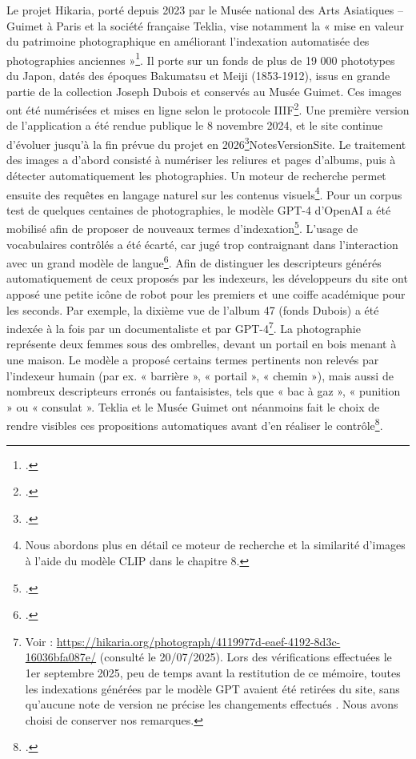 Le projet Hikaria, porté depuis 2023 par le Musée national des Arts Asiatiques – Guimet à Paris et la société française Teklia, vise notamment la « mise en valeur du patrimoine photographique en améliorant l’indexation automatisée des photographies anciennes »\footcite[p. 24]{desaint-oursProjetHikarIAEtude2024}. Il porte sur un fonds de plus de 19 000 phototypes du Japon, datés des époques Bakumatsu et Meiji (1853-1912), issus en grande partie de la collection Joseph Dubois et conservés au Musée Guimet. Ces images ont été numérisées et mises en ligne selon le protocole IIIF\footcite[p. 20]{desaint-oursProjetHikarIAEtude2024}. Une première version de l’application a été rendue publique le 8 novembre 2024, et le site continue d’évoluer jusqu’à la fin prévue du projet en 2026\footcite[p. 24]{desaint-oursProjetHikarIAEtude2024}{NotesVersionSite}. Le traitement des images a d’abord consisté à numériser les reliures et pages d’albums, puis à détecter automatiquement les photographies. Un moteur de recherche permet ensuite des requêtes en langage naturel sur les contenus visuels\footnote{Nous abordons plus en détail ce moteur de recherche et la similarité d’images à l’aide du modèle CLIP dans le chapitre 8.}. Pour un corpus test de quelques centaines de photographies, le modèle GPT-4 d’OpenAI a été mobilisé afin de proposer de nouveaux termes d’indexation\footcite{kermorvantProjetHikarIAAnalyse2025}. L’usage de vocabulaires contrôlés a été écarté, car jugé trop contraignant dans l’interaction avec un grand modèle de langue\footcite[p. 23]{desaint-oursProjetHikarIAEtude2024}. Afin de distinguer les descripteurs générés automatiquement de ceux proposés par les indexeurs, les développeurs du site ont apposé une petite icône de robot pour les premiers et une coiffe académique pour les seconds. Par exemple, la dixième vue de l’album 47 (fonds Dubois) a été indexée à la fois par un documentaliste et par GPT-4\footnote{Voir : \url{https://hikaria.org/photograph/4119977d-eaef-4192-8d3c-16036bfa087e/} (consulté le 20/07/2025). Lors des vérifications effectuées le 1er septembre 2025, peu de temps avant la restitution de ce mémoire, toutes les indexations générées par le modèle GPT avaient été retirées du site, sans qu’aucune note de version ne précise les changements effectués \cite{NotesVersionHikaria}. Nous avons choisi de conserver nos remarques.}. La photographie représente deux femmes sous des ombrelles, devant un portail en bois menant à une maison. Le modèle a proposé certains termes pertinents non relevés par l’indexeur humain (par ex. « barrière », « portail », « chemin »), mais aussi de nombreux descripteurs erronés ou fantaisistes, tels que « bac à gaz », « punition » ou « consulat ». Teklia et le Musée Guimet ont néanmoins fait le choix de rendre visibles ces propositions automatiques avant d’en réaliser le contrôle\footcite{kermorvantProjetHikarIAAnalyse2025}.

